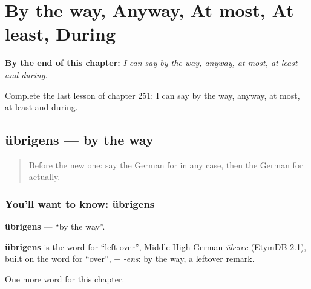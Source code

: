 
\chapter{By the way, Anyway, At most, At least, During}
\label{ch:ge-by-the-way-anyway-at-most-at-least-during}

\begin{chapteropening}
\textbf{By the end of this chapter:} \emph{I can say by the way, anyway, at most, at least and during.}

Complete the last lesson of chapter 251: I can say by the way, anyway, at most, at least and during.
\end{chapteropening}

\section[übrigens]{übrigens — by the way}

\label{lesson:GE-C251-uebrigens}



\begin{quote}
Before the new one: say the German for in any case, then the German for actually.
\end{quote}

\subsection*{You'll want to know: übrigens}
\textbf{übrigens} — \textquotedblleft{}by the way\textquotedblright{}.

\begin{cousinweb}
\textbf{übrigens} is the word for \textquotedblleft{}left over\textquotedblright{}, Middle High German \emph{überec} (EtymDB 2.1), built on the word for \textquotedblleft{}over\textquotedblright{}, + \emph{-ens}: by the way, a leftover remark.
\end{cousinweb}

\begin{grammarlens}[title={What you've built}]
One more word for this chapter.
\end{grammarlens}

